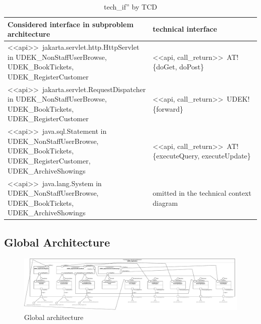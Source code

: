 \documentclass[a4paper,10pt,titlepage,bibtotoc,bibtotocnumbered]{scrreprt}
\begin{document}
\begin{table}[H]
    \centering
    \begin{tabular}{|p{0.5\linewidth}|p{0.5\linewidth}|}
        \hline
        \textbf{Considered interface in subproblem architecture} & \textbf{technical interface} \\\hline\hline
        \textless\textless api\textgreater\textgreater\ jakarta.servlet.http.HttpServlet in UDEK\_NonStaffUserBrowse, UDEK\_BookTickets, UDEK\_RegisterCustomer
        & \textless\textless api, call\_return\textgreater\textgreater\ AT!\{doGet, doPost\}
        \\\hline
        \textless\textless api\textgreater\textgreater\ jakarta.servlet.RequestDispatcher in UDEK\_NonStaffUserBrowse, UDEK\_BookTickets, UDEK\_RegisterCustomer
        & \textless\textless api, call\_return\textgreater\textgreater\ UDEK!\{forward\}
        \\\hline
        \textless\textless api\textgreater\textgreater\ java.sql.Statement in UDEK\_NonStaffUserBrowse, UDEK\_BookTickets, UDEK\_RegisterCustomer, UDEK\_ArchiveShowings
        & \textless\textless api, call\_return\textgreater\textgreater\ AT!\{executeQuery, executeUpdate\}
        \\\hline
        \textless\textless api\textgreater\textgreater\ java.lang.System in UDEK\_NonStaffUserBrowse, UDEK\_BookTickets, UDEK\_ArchiveShowings
        & omitted in the technical context diagram
        \\\hline
    \end{tabular}
    \caption{tech\_if'' by TCD}
    \label{tab:tech_if}
\end{table}

\subsection{Global Architecture}
\begin{figure}[H]
    \centering
    \includegraphics[width = \textwidth]{figures/08/A08_global_architecture.pdf}
    \caption{Global architecture}
    \label{figure:global_architecture}
\end{figure}
\end{document}
